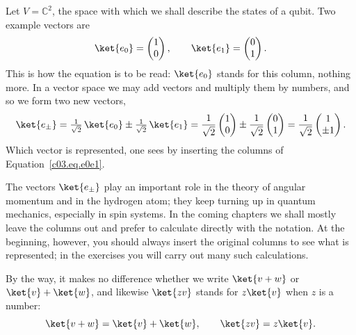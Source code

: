 \begin{example}\label{c03.ex.kets}
  Let $V = \mathbb{C}^2$, the space with which we shall describe the states of a qubit. Two
  example vectors are
  \begin{equation}\label{c03.eq.e0e1}
    \ket{e_0} = \begin{pmatrix} 1 \\ 0 \end{pmatrix},
    \qquad
    \ket{e_1} = \begin{pmatrix} 0 \\ 1 \end{pmatrix} .
  \end{equation}
  This is how the equation is to be read: $\ket{e_0}$ stands for this column, nothing more. In
  a vector space we may add vectors and multiply them by numbers, and so we form two new
  vectors,
  \begin{equation}\label{c03.eq.epm}
    \ket{e_\pm} = \tfrac{1}{\sqrt{2}}\, \ket{e_0} \pm \tfrac{1}{\sqrt{2}}\, \ket{e_1}
    = \frac{1}{\sqrt{2}} \begin{pmatrix} 1 \\ 0 \end{pmatrix} \pm \frac{1}{\sqrt{2}} \begin{pmatrix} 0 \\ 1 \end{pmatrix}
    = \frac{1}{\sqrt{2}} \begin{pmatrix} 1 \\ \pm 1 \end{pmatrix} .
  \end{equation}
  Which vector is represented, one sees by inserting the columns of
  Equation~\eqref{c03.eq.e0e1}.
\end{example}

The vectors $\ket{e_\pm}$ play an important role in the theory of angular momentum and in the
hydrogen atom; they keep turning up in quantum mechanics, especially in spin systems. In the
coming chapters we shall mostly leave the columns out and prefer to calculate directly
with the notation. At the beginning, however, you should always insert the original columns to
see what is represented; in the exercises you will carry out many such calculations.

By the way, it makes no difference whether we write $\ket{v + w}$ or $\ket{v} + \ket{w}$, and
likewise $\ket{z v}$ stands for $z \ket{v}$ when $z$ is a number:
\begin{equation*}
  \ket{v + w} = \ket{v} + \ket{w} ,
  \qquad
  \ket{z v} = z \ket{v} .
\end{equation*}

